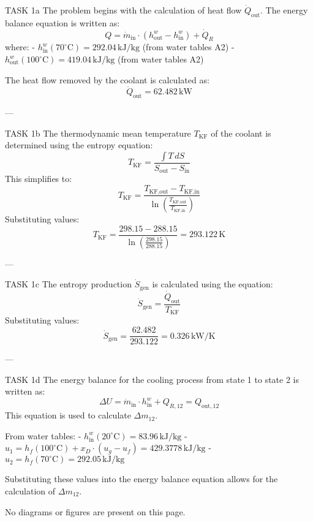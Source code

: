 TASK 1a  
The problem begins with the calculation of heat flow \( \dot{Q}_{\text{out}} \). The energy balance equation is written as:  
\[
Q = \dot{m}_{\text{in}} \cdot \left( h_{\text{out}}^{w} - h_{\text{in}}^{w} \right) + \dot{Q}_R
\]  
where:  
- \( h_{\text{in}}^{w}(70^\circ\text{C}) = 292.04 \, \text{kJ/kg} \) (from water tables A2)  
- \( h_{\text{out}}^{w}(100^\circ\text{C}) = 419.04 \, \text{kJ/kg} \) (from water tables A2)  

The heat flow removed by the coolant is calculated as:  
\[
\dot{Q}_{\text{out}} = 62.482 \, \text{kW}
\]  

---

TASK 1b  
The thermodynamic mean temperature \( T_{\text{KF}} \) of the coolant is determined using the entropy equation:  
\[
T_{\text{KF}} = \frac{\int T \, dS}{S_{\text{out}} - S_{\text{in}}}
\]  
This simplifies to:  
\[
T_{\text{KF}} = \frac{T_{\text{KF,out}} - T_{\text{KF,in}}}{\ln\left(\frac{T_{\text{KF,out}}}{T_{\text{KF,in}}}\right)}
\]  
Substituting values:  
\[
T_{\text{KF}} = \frac{298.15 - 288.15}{\ln\left(\frac{298.15}{288.15}\right)} = 293.122 \, \text{K}
\]  

---

TASK 1c  
The entropy production \( \dot{S}_{\text{gen}} \) is calculated using the equation:  
\[
\dot{S}_{\text{gen}} = \frac{\dot{Q}_{\text{out}}}{T_{\text{KF}}}
\]  
Substituting values:  
\[
\dot{S}_{\text{gen}} = \frac{62.482}{293.122} = 0.326 \, \text{kW/K}
\]  

---

TASK 1d  
The energy balance for the cooling process from state 1 to state 2 is written as:  
\[
\Delta U = \dot{m}_{\text{in}} \cdot h_{\text{in}}^{w} + Q_{R,12} = Q_{\text{out},12}
\]  
This equation is used to calculate \( \Delta m_{12} \).  

From water tables:  
- \( h_{\text{in}}^{w}(20^\circ\text{C}) = 83.96 \, \text{kJ/kg} \)  
- \( u_1 = h_f(100^\circ\text{C}) + x_D \cdot (u_g - u_f) = 429.3778 \, \text{kJ/kg} \)  
- \( u_2 = h_f(70^\circ\text{C}) = 292.05 \, \text{kJ/kg} \)  

Substituting these values into the energy balance equation allows for the calculation of \( \Delta m_{12} \).  

No diagrams or figures are present on this page.